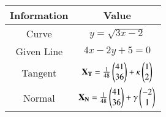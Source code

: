\begin{tabular}[12pt]{|c|c|}
    \hline
	\textbf{Information} & \textbf{Value} \\ 
    \hline
	Curve & $y=\sqrt{3x-2}$ \\
    \hline 
        Given Line & $4x-2y+5=0$ \\
    \hline   
        Tangent & $\mathbf{X_T}=\frac{1}{48}\begin{pmatrix}41\\36\end{pmatrix} + \kappa \begin{pmatrix}1\\2\end{pmatrix}$ \\
    \hline
	Normal & $\mathbf{X_N}=\frac{1}{48}\begin{pmatrix}41\\36\end{pmatrix} + \gamma \begin{pmatrix}-2\\1\end{pmatrix}$ \\
	\hline
    \end{tabular}

